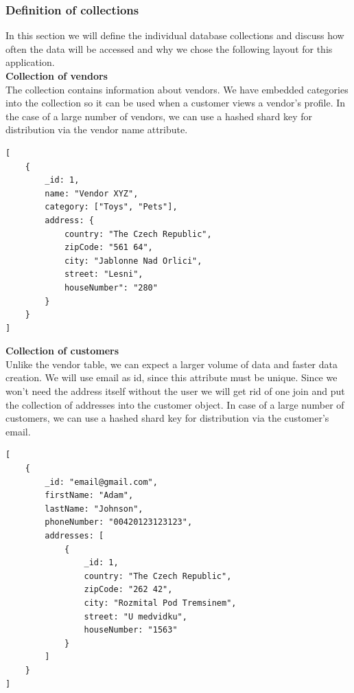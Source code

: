 \documentclass[12pt,english]{article}
\begin{document}
\subsubsection{Definition of collections}
In this section we will define the individual database collections and discuss how often the data will be accessed and why we chose the following layout for this application.\\

\noindent\textbf{Collection of vendors}\\
The collection contains information about vendors. We have embedded categories into the collection so it can be used when a customer views a vendor's profile. In the case of a large number of vendors, we can use a hashed shard key for distribution via the vendor name attribute.
\begin{lstlisting}[style=jsonstyle]
[
    {
        _id: 1,
        name: "Vendor XYZ",
        category: ["Toys", "Pets"],
        address: {
            country: "The Czech Republic",
            zipCode: "561 64",
            city: "Jablonne Nad Orlici",
            street: "Lesni",
            houseNumber": "280"
        }
    }
]
\end{lstlisting}

\newpage
\noindent\textbf{Collection of customers}\\
Unlike the vendor table, we can expect a larger volume of data and faster data creation. We will use email as id, since this attribute must be unique. Since we won't need the address itself without the user we will get rid of one join and put the collection of addresses into the customer object. In case of a large number of customers, we can use a hashed shard key for distribution via the customer's email.
\begin{lstlisting}[style=jsonstyle]
[
    {
        _id: "email@gmail.com",
        firstName: "Adam",
        lastName: "Johnson",
        phoneNumber: "00420123123123",
        addresses: [
            {
                _id: 1,
                country: "The Czech Republic",
                zipCode: "262 42",
                city: "Rozmital Pod Tremsinem",
                street: "U medvidku",
                houseNumber: "1563"
            }
        ]
    }
]
\end{lstlisting}
\end{document}
